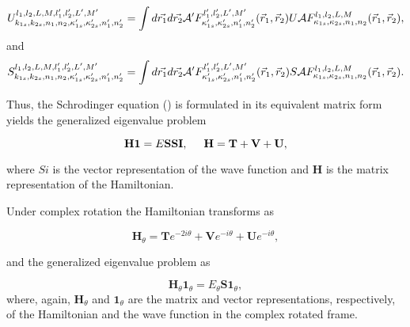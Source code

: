 \begin{equation}		
U_{k_{1s},k_{2s},n_{1},n_{2},\kappa_{1s}^{\prime}, \kappa_{2s}^{\prime},n_{1}^{\prime},n_{2}^{\prime}}^{l_{1},l_{2},L,M,l_{1}^{\prime},l_{2}^{\prime},L^{\prime},M^{\prime}}=\int d\vec{r_{1}}d\vec{r_{2}} {\cal A}^{\prime} F_{\kappa_{1s}^{\prime}, \kappa_{2s}^{\prime},n_{1}^{\prime},n_{2}^{\prime}}^{l_{1}^{\prime},l_{2}^{\prime},L^{\prime},M^{\prime}}(\vec{r}_{1},\vec{r}_{2}) U {\cal A}  F_{\kappa_{1s}, \kappa_{2s},n_{1},n_{2}}^{l_{1},l_{2},L,M}(\vec{r}_{1},\vec{r}_{2}),
\end{equation}
and
\begin{equation}		
S_{k_{1s},k_{2s},n_{1},n_{2},\kappa_{1s}^{\prime}, \kappa_{2s}^{\prime},n_{1}^{\prime},n_{2}^{\prime}}^{l_{1},l_{2},L,M,l_{1}^{\prime},l_{2}^{\prime},L^{\prime},M^{\prime}}=\int d\vec{r_{1}}d\vec{r_{2}} {\cal A}^{\prime} F_{\kappa_{1s}^{\prime}, \kappa_{2s}^{\prime},n_{1}^{\prime},n_{2}^{\prime}}^{l_{1}^{\prime},l_{2}^{\prime},L^{\prime},M^{\prime}}(\vec{r}_{1},\vec{r}_{2}) S {\cal A}  F_{\kappa_{1s}, \kappa_{2s},n_{1},n_{2}}^{l_{1},l_{2},L,M}(\vec{r}_{1},\vec{r}_{2}).
\end{equation}

Thus, the Schrodinger equation () is formulated in its equivalent matrix form yields the generalized eigenvalue problem

\begin{equation}
	\textbf{H} \textbf{1}=E\textbf{S} \textbf{SI}, \hspace{0.5cm} \textbf{H}=\textbf{T}+\textbf{V}+\textbf{U},
\end{equation}

where $ Si $ is the vector representation of the wave function and $ \textbf{H} $ is the matrix representation of the Hamiltonian.

Under complex rotation the Hamiltonian transforms as

\begin{equation}
\textbf{H}_{\theta}=\textbf{T}e^{-2i\theta}+\textbf{V}e^{-i\theta}+\textbf{U}e^{-i\theta},
\end{equation}

and the generalized eigenvalue problem as 

\begin{equation}
\textbf{H}_{\theta} \textbf{1}_{\theta}=E_{\theta}\textbf{S} \textbf{1}_{\theta}, 
\end{equation}
where, again, $ \textbf{H}_{\theta} $ and $  \textbf{1}_{\theta} $ are the matrix and vector representations, respectively, of the Hamiltonian and the wave function in the complex rotated frame.

